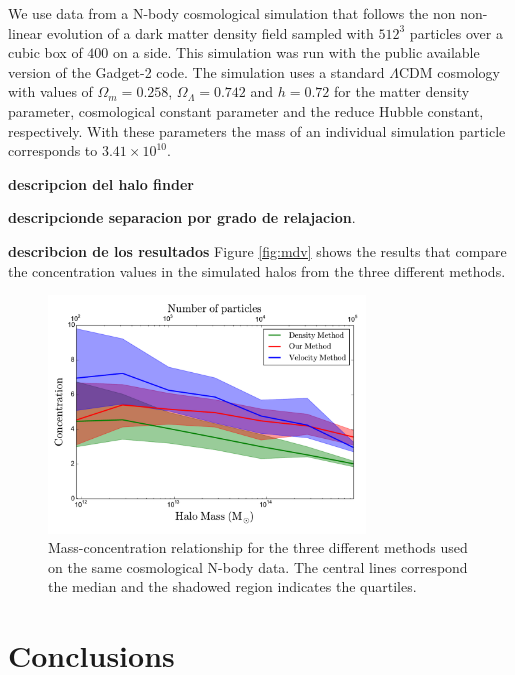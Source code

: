 \documentclass{emulateapj}
\newcommand{\hMpc}{{\ifmmode{h^{-1}{\rm Mpc}}\else{$h^{-1}$Mpc }\fi}}
\newcommand{\hMsun}{{\ifmmode{h^{-1}{\rm
        {M_{\odot}}}}\else{$h^{-1}{\rm{M_{\odot}}}$}\fi}}
\begin{document}
We use data from a N-body cosmological simulation that follows the non
non-linear evolution of a dark matter density field sampled with
$512^3$ particles over a cubic box of $400$ \hMpc on a side. 
This simulation was run with the public available version of the
Gadget-2 code. 
The simulation uses a standard $\Lambda$CDM cosmology with values of
$\Omega_m=0.258$, $\Omega_\Lambda=0.742$ and $h=0.72$ for the matter
density parameter, cosmological constant parameter and the reduce
Hubble constant, respectively. 
With these parameters the mass of an individual simulation particle
corresponds to $3.41\times 10^{10}$\hMsun.

{\bf descripcion del halo finder}

{\bf descripcionde separacion por grado de relajacion}.


{\bf describcion de los resultados}
Figure \ref{fig:mdv} shows the results that compare the concentration
values in the simulated halos from the three different methods.



\begin{figure}
\begin{center}
  \includegraphics[width=0.75\textwidth]{concentration.pdf}
\end{center}
\caption{Mass-concentration relationship for the three different
  methods used on the same cosmological N-body data. The central lines
  correspond the median and the shadowed region indicates the
  quartiles.
    \label{fig:concentration}}
\end{figure}




\section{Conclusions}
\label{sec:conclusions}
\end{document}
